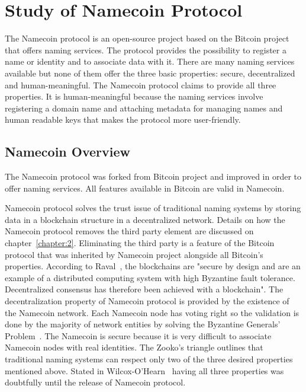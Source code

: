 \chapter{Study of Namecoin Protocol}
\label{chapter:3}
The Namecoin protocol is an open-source project based on the Bitcoin project that offers naming services.
The protocol provides the possibility to register a name or identity and to associate data with it.
There are many naming services available but none of them offer the three basic properties: secure, decentralized and human-meaningful.
The Namecoin protocol claims to  provide all three properties.
It is human-meaningful because the naming services involve registering a domain name  and attaching metadata for managing names and human readable keys that makes the protocol more user-friendly. 

\section{Namecoin Overview}
\label{run-nmc-lbl}
The Namecoin protocol was forked from Bitcoin project and improved in order to offer naming services. All features available in Bitcoin are valid in Namecoin. 

Namecoin protocol solves the trust issue of traditional naming systems by storing data in a blockchain structure in a decentralized network. Details on how the Namecoin protocol removes the third party element are discussed on chapter~\ref{chapter:2}. Eliminating the third party is a feature of the Bitcoin protocol that was inherited by Namecoin project alongside all Bitcoin's properties.
According to Raval~\cite{blockchain}, the blockchains are "secure by design and are an example of a distributed computing system with high Byzantine fault tolerance. Decentralized consensus has therefore been achieved with a blockchain". The decentralization property of Namecoin protocol is provided by the existence of the Namecoin network. Each Namecoin node has voting right so the validation is done by the majority of network entities by solving the Byzantine Generals' Problem~\cite{bft}.
The Namecoin is secure because it is very difficult to associate Namecoin nodes with real identities.
The Zooko's triangle outlines that traditional naming systems can respect only two of the three desired properties mentioned above. Stated in Wilcox-O’Hearn~\cite{wilcox2001names} having all three properties was doubtfully until the release of Namecoin protocol.

